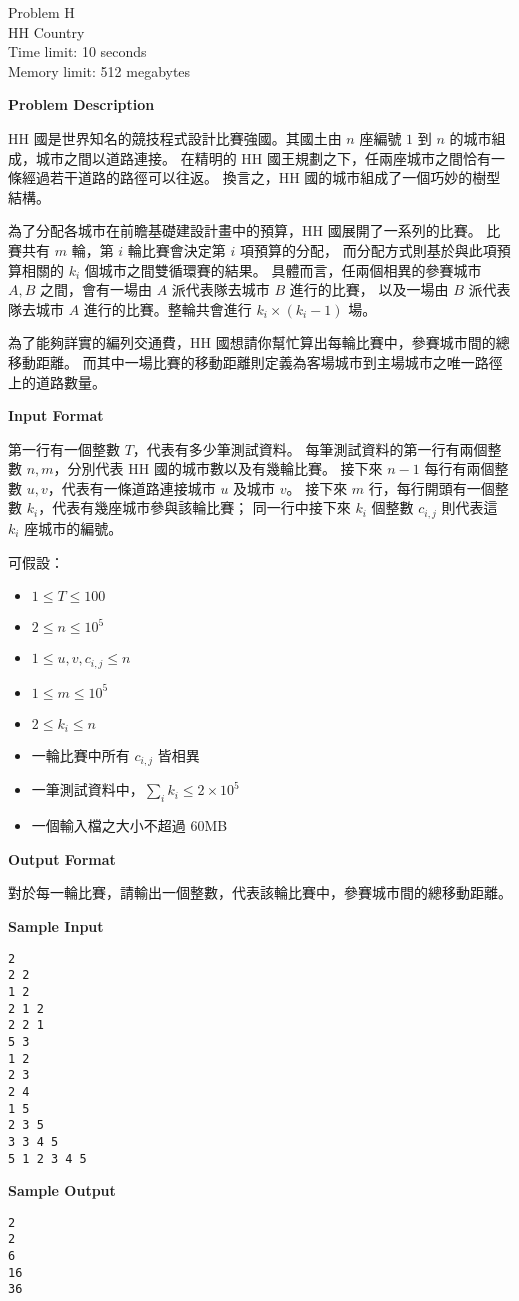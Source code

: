 \begin{center}
    {\LARGE Problem H}\vspace{1mm}\\
    {\Large HH Country}\\
    {Time limit: 10 seconds}\\
    {Memory limit: 512 megabytes}
\end{center}

\textbf{\large Problem Description}

HH 國是世界知名的競技程式設計比賽強國。其國土由 $n$ 座編號 $1$ 到 $n$ 的城市組成，城市之間以道路連接。
在精明的 HH 國王規劃之下，任兩座城市之間恰有一條經過若干道路的路徑可以往返。
換言之，HH 國的城市組成了一個巧妙的樹型結構。

為了分配各城市在前瞻基礎建設計畫中的預算，HH 國展開了一系列的比賽。
比賽共有 $m$ 輪，第 $i$ 輪比賽會決定第 $i$ 項預算的分配，
而分配方式則基於與此項預算相關的 $k_i$ 個城市之間雙循環賽的結果。
具體而言，任兩個相異的參賽城市 $A, B$ 之間，會有一場由 $A$ 派代表隊去城市 $B$ 進行的比賽，
以及一場由 $B$ 派代表隊去城市 $A$ 進行的比賽。整輪共會進行 $k_i \times (k_i - 1)$ 場。

為了能夠詳實的編列交通費，HH 國想請你幫忙算出每輪比賽中，參賽城市間的總移動距離。
而其中一場比賽的移動距離則定義為客場城市到主場城市之唯一路徑上的道路數量。

\textbf{\large Input Format}

第一行有一個整數 $T$，代表有多少筆測試資料。
每筆測試資料的第一行有兩個整數 $n, m$，分別代表 HH 國的城市數以及有幾輪比賽。
接下來 $n - 1$ 每行有兩個整數 $u, v$，代表有一條道路連接城市 $u$ 及城市 $v$。
接下來 $m$ 行，每行開頭有一個整數 $k_i$，代表有幾座城市參與該輪比賽；
同一行中接下來 $k_i$ 個整數 $c_{i, j}$ 則代表這 $k_i$ 座城市的編號。

可假設：
\begin{itemize}
    \tightlist{}
    \item $1 \le T \le 100$
    \item $2 \le n \le 10^5$
    \item $1 \le u, v, c_{i, j} \le n$
    \item $1 \le m \le 10^5$
    \item $2 \le k_i \le n$
    \item 一輪比賽中所有 $c_{i, j}$ 皆相異
    \item 一筆測試資料中，$\sum_i k_i \le 2 \times 10^5$ 
    \item 一個輸入檔之大小不超過 60MB
\end{itemize}

\textbf{\large Output Format}

對於每一輪比賽，請輸出一個整數，代表該輪比賽中，參賽城市間的總移動距離。

\textbf{\large Sample Input}

\begin{verbatim}
2
2 2
1 2
2 1 2
2 2 1
5 3
1 2
2 3
2 4
1 5
2 3 5
3 3 4 5
5 1 2 3 4 5
\end{verbatim}

\textbf{\large Sample Output}

\begin{verbatim}
2
2
6
16
36
\end{verbatim}

